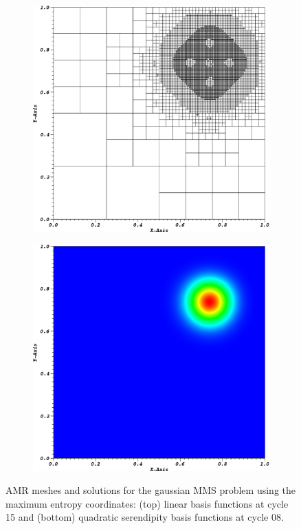 \begin{figure}
{\begin{subfigure}[b]{0.485\textwidth}
	\end{subfigure}
}
\vspace{1cm}
{
	\begin{subfigure}[b]{0.485\textwidth}
		\centering
		\label{subfig::AMR_GQ_ME2_mesh}
		\includegraphics[width=\textwidth]{figures/sec_BF/ME2_cart_Irr=1_cyc08_mesh.eps}
	\end{subfigure}
	\hfill
	\begin{subfigure}[b]{0.485\textwidth}
		\centering
		\label{subfig::AMR_GQ_ME2_sol}
		\includegraphics[width=\textwidth]{figures/sec_BF/ME2_cart_Irr=1_cyc08_sol.eps}
	\end{subfigure}
}
\caption{AMR meshes and solutions for the gaussian MMS problem using the maximum entropy coordinates: (top) linear basis functions at cycle 15 and (bottom) quadratic serendipity basis functions at cycle 08.}
\label{fig::BF_Results_MMS_GQ_AMR_MeshSol}
\end{figure}
